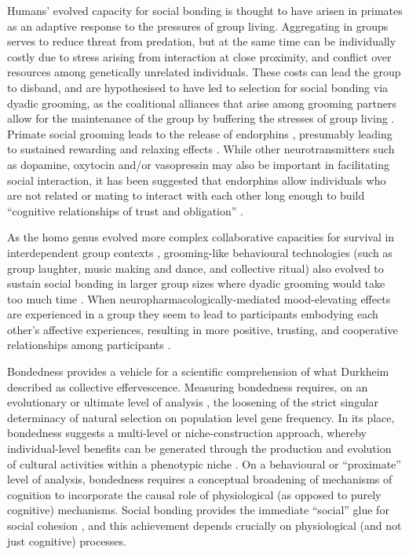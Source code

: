 \begin{CJK}{UTF8}{gbsn}
Humans' evolved capacity for social bonding is thought to have arisen in primates as an adaptive response to the pressures of group living.  Aggregating in groups serves to reduce threat from predation, but at the same time can be individually costly due to stress arising from interaction at close proximity, and conflict over resources among genetically unrelated individuals.  These costs can lead the group to disband, and are hypothesised to have led to selection for social bonding via dyadic grooming, as the coalitional alliances that arise among grooming partners allow for the maintenance of the group by buffering the stresses of group living \citep{Dunbar2012}.  Primate social grooming leads to the release of endorphins \citep[a type of endogenous opioid, see][]{Keverne1989}, presumably leading to sustained rewarding and relaxing effects \citep{Dunbar2010}.  While other neurotransmitters such as dopamine, oxytocin and/or vasopressin may also be important in facilitating social interaction, it has been suggested that endorphins allow individuals who are not related or mating to interact with each other long enough to build ``cognitive relationships of trust and obligation'' \citep[1839]{Dunbar2012}.

As the homo genus evolved more complex collaborative capacities for survival in interdependent group contexts \citep[see][]{Dunbar1998,Tomasello2012a}, grooming-like behavioural technologies (such as group laughter, music making and dance, and collective ritual) also evolved \citep[via processes of multi-level cultural group selection, cf.][]{Wilson2008} to sustain social bonding in larger group sizes where dyadic grooming would take too much time \citep{Dunbar2012,Tarr2014,Launay2016}. When neuropharmacologically-mediated mood-elevating effects are experienced in a group they seem to lead to participants embodying each other’s affective experiences, resulting in more positive, trusting, and cooperative relationships among participants \citep{Dunbar2012}.

Bondedness provides a vehicle for a scientific comprehension of what Durkheim described as collective effervescence.  Measuring bondedness requires, on an evolutionary or ultimate level of analysis \citep[cf.][]{Mayr1961,Tinbergen1963}, the loosening of the strict singular determinacy of natural selection on population level gene frequency.  In its place, bondedness suggests a multi-level or niche-construction approach, whereby individual-level benefits can be generated through the production and evolution of cultural activities within a phenotypic niche \citep{Dunbar2012,Laland2010,Laland2015}.  On a behavioural or ``proximate'' level of analysis, bondedness requires a conceptual broadening of mechanisms of cognition to incorporate the causal role of physiological (as opposed to purely cognitive) mechanisms.  Social bonding provides the immediate ``social'' glue for social cohesion \citep[cf.][]{Lakin2003,Bastian2014a}, and this achievement depends crucially on physiological (and not just cognitive) processes.


\end{CJK}
